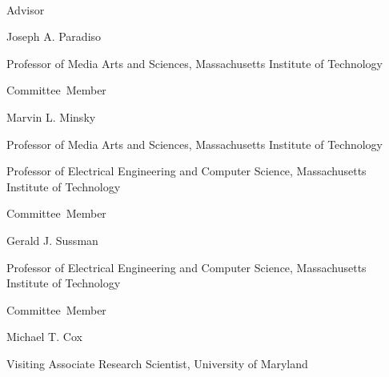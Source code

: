 \thispagestyle{empty}
\begin{center}
    \spacedlowsmallcaps{\myName} \\ \medskip                        

    \begingroup
        \color{Maroon}\spacedallcaps{\myTitle}
    \endgroup
\end{center}        

\begin{flushright}
           Advisor\hspace{0.5cm}~\makebox[2.75in]{\hrulefill}

                                 Joseph A. Paradiso

                                 Professor of Media Arts and Sciences, Massachusetts Institute of Technology
                                 
  \vspace{5mm}
  
  Committee~Member\hspace{0.5cm}~\makebox[2.75in]{\hrulefill}
  
                                 Marvin L. Minsky

                                 Professor of Media Arts and Sciences, Massachusetts Institute of Technology

                                 Professor of Electrical Engineering and Computer Science, Massachusetts Institute of Technology
                                 
  Committee~Member\hspace{0.5cm}~\makebox[2.75in]{\hrulefill}
  
                                 Gerald J. Sussman

                                 Professor of Electrical Engineering and Computer Science, Massachusetts Institute of Technology

  Committee~Member\hspace{0.5cm}~\makebox[2.75in]{\hrulefill}

                                 Michael T. Cox

                                 Visiting Associate Research Scientist, University of Maryland

\end{flushright}


